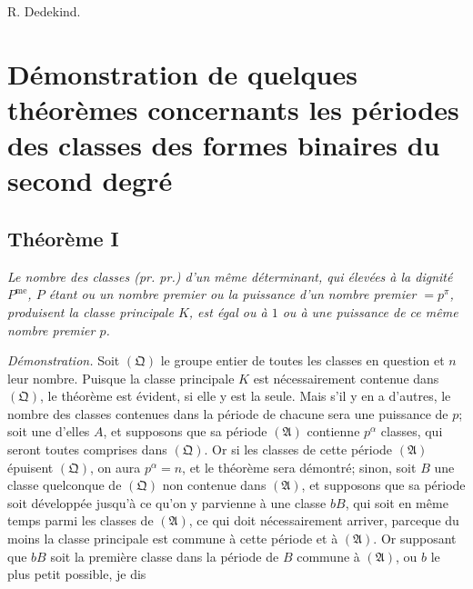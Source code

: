 \documentclass[12pt]{article}
\begin{document}
\begin{flushright}
R. Dedekind.
\end{flushright}

\clearpage
{}
\section*{Démonstration de quelques théorèmes concernants les périodes des classes des formes binaires du second degré}

\subsection*{Théorème I}

\emph{Le nombre des classes (pr. pr.) d'un même déterminant, qui élevées à la dignité $P^{\mathrm{me}}$, $P$ étant ou un nombre premier ou la puissance d'un nombre premier $=p^\pi$, produisent la classe principale $K$, est égal ou à $1$ ou à une puissance de ce même nombre premier $p$.}

\emph{Démonstration.} Soit $(\mathfrak Q)$ le groupe entier de toutes les classes en question et $n$ leur nombre. Puisque la classe principale $K$ est nécessairement contenue dans $(\mathfrak Q)$, le théorème est évident, si elle y est la seule. Mais s'il y en a d'autres, le nombre des classes contenues dans la période de chacune sera une puissance de $p$; soit une d'elles $A$, et supposons que sa période $(\mathfrak A)$ contienne $p^\alpha$ classes, qui seront toutes comprises dans $(\mathfrak Q)$. Or si les classes de cette période $(\mathfrak A)$ épuisent $(\mathfrak Q)$, on aura $p^\alpha=n$, et le théorème sera démontré; sinon, soit $B$ une classe quelconque de $(\mathfrak Q)$ non contenue dans $(\mathfrak A)$, et supposons que sa période soit développée jusqu'à ce qu'on y parvienne à une classe $bB$, qui soit en même temps parmi les classes de $(\mathfrak A)$, ce qui doit nécessairement arriver, parceque du moins la classe principale est commune à cette période et à $(\mathfrak A)$. Or supposant que $bB$ soit la première classe dans la période de $B$ commune à $(\mathfrak A)$, ou $b$ le plus petit possible, je dis
\end{document}
